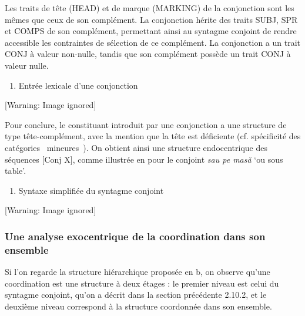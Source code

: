 Les traits de tête (HEAD) et de marque (MARKING) de la conjonction sont les mêmes que ceux de son complément. La conjonction hérite des traits SUBJ, SPR et COMPS de son complément, permettant ainsi au syntagme conjoint de rendre accessible les contraintes de sélection de ce complément. La conjonction a un trait CONJ à valeur non-nulle, tandis que son complément possède un trait CONJ à valeur nulle.


\begin{enumerate}
\item \label{bkm:Ref290400569}Entrée lexicale d'une conjonction


\end{enumerate}
  [Warning: Image ignored] %
  

Pour conclure, le constituant introduit par une conjonction a une structure de type tête-complément, avec la mention que la tête est déficiente (cf. spécificité des catégories {\guillemotleft}~mineures~{\guillemotright}). On obtient ainsi une structure endocentrique des séquences [Conj X], comme illustrée en  pour le conjoint \textit{sau pe masă} `ou sous table'. 


\begin{enumerate}
\item \label{bkm:Ref301789151}Syntaxe simplifiée du syntagme conjoint


\end{enumerate}
{   [Warning: Image ignored] %
} 

\subsubsection{Une analyse exocentrique de la coordination dans son ensemble}
\label{bkm:Ref301808531}Si l'on regarde la structure hiérarchique proposée en b, on observe qu'une coordination est une structure à deux étages : le premier niveau est celui du syntagme conjoint, qu'on a décrit dans la section précédente 2.10.2, et le deuxième niveau correspond à la structure coordonnée dans son ensemble.

